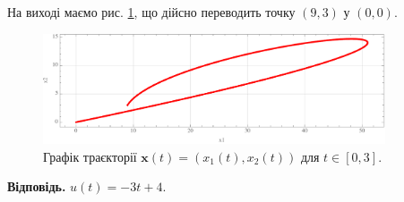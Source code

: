\documentclass[oneside,solution]{karazin-control-assign}
\begin{document}
На виході маємо рис. \ref{fig:problem-2}, що дійсно переводить точку $(9,3)$ у $(0,0)$.

\begin{figure}
    \centering
    \includegraphics[width=0.9\textwidth]{plot_2.pdf}
    \caption{Графік траєкторії $\mathbf{x}(t)=(x_1(t),x_2(t))$ для $t \in [0,3]$.}
    \label{fig:problem-2}
\end{figure}

\textbf{Відповідь.} $u(t)=-3t+4$.
\end{document}
